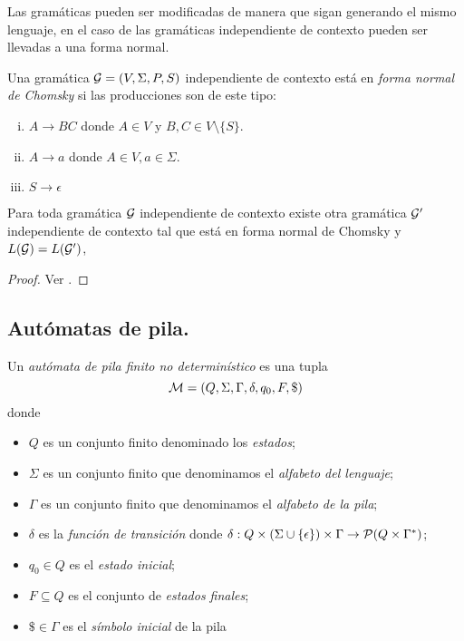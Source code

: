\documentclass[tesis.tex]{subfiles}
\begin{document}
Las gramáticas pueden ser modificadas de manera que sigan generando el mismo lenguaje, en el caso de las gramáticas independiente de contexto pueden ser llevadas a una forma normal.

\begin{deff}
	Una gramática ${\cal G} = (V, \Sigma, P, S)$ independiente de contexto está en \emph{forma normal de Chomsky} si las producciones son de este tipo:
	\begin{enumerate}[i)]
		\item $A \to BC$ donde $A\in V$ y $B,C \in V \setminus \{ S \}$.
		\item $A \to a$ donde $A \in V, a \in \Sigma$.
		\item $S \to \epsilon$ 
	\end{enumerate}
\end{deff}

\begin{prop}\label{prop_fn_Chomsky}
	Para toda gramática $\cal G$ independiente de contexto existe otra gramática $\cal G'$ independiente de contexto tal que está en forma normal de Chomsky y $L({\cal G}) = L(\cal G')$,
\end{prop}

\begin{proof}
	Ver \cite[pp.274-275]{hopcraft-ullman}.
\end{proof}

\subsection{Autómatas de pila.}

\begin{deff}\label{deff_apnd}
	Un \emph{autómata de pila finito no determinístico} es una tupla 
	\[
	{\cal M } = (Q, \Sigma, \Gamma, \delta, q_0, F, \$)
	\]
	donde 
	\begin{itemize}
		\item $Q$ es un conjunto finito denominado los \emph{estados};
		\item $\Sigma$ es un conjunto finito que denominamos el \emph{alfabeto del lenguaje};
		\item $\Gamma$ es un conjunto finito que denominamos el \emph{alfabeto de la pila};
		\item $\delta$ es la \emph{función de transición} donde $\delta: Q  \times (\Sigma \cup \{ \epsilon \}) \times \Gamma \to {\cal P}( Q  \times \Gamma^*)$;
		\item $q_0 \in Q$ es el \emph{estado inicial};
		\item $F \subseteq Q$ es el conjunto de \emph{estados finales};
		\item $\$ \in \Gamma$ es el \emph{símbolo inicial} de la pila
	\end{itemize}
\end{deff}
\end{document}
